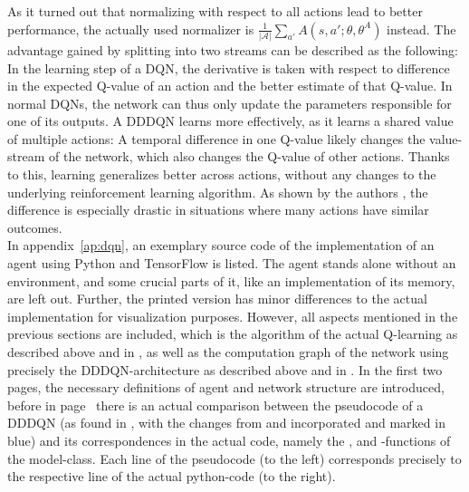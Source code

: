 As it turned out that normalizing with respect to all actions lead to better performance, the actually used normalizer is $\frac{1}{|\mathcal{A}|} \sum_{a'} A(s, a'; \theta, \theta^A)$ instead. The advantage gained by splitting into two streams can be described as the following: In the learning step of a DQN, the derivative is taken with respect to difference in the expected Q-value of an action and the better estimate of that Q-value. In normal DQNs, the network can thus only update the parameters responsible for one of its outputs. A DDDQN learns more effectively, as it learns a shared value of multiple actions: A temporal difference in one Q-value likely changes the value-stream of the network, which also changes the Q-value of other actions. Thanks to this, learning generalizes better across actions, without any changes to the underlying reinforcement learning algorithm. As shown by the authors \cite{wang_dueling_2015}, the difference is especially drastic in situations where many actions have similar outcomes.\\


In appendix~\ref{ap:dqn}, an exemplary source code of the implementation of an agent using Python and TensorFlow is listed. The agent stands alone without an environment, and some crucial parts of it, like an implementation of its memory, are left out. Further, the printed version has minor differences to the actual implementation for visualization purposes. However, all aspects mentioned in the previous sections are included, which is the algorithm of the actual Q-learning as described above and in \cite{van_hasselt_deep_2015}, as well as the computation graph of the network using precisely the DDDQN-architecture as described above and in \cite{wang_dueling_2015}. In the first two pages, the necessary definitions of agent and network structure are introduced, before in page~\pageref{ap:dqn_comparison} there is an actual comparison between the pseudocode of a DDDQN (as found in \cite{mnih_human-level_2015}, with the changes from \cite{van_hasselt_deep_2015} and \cite{lillicrap_continuous_2015} incorporated and marked in blue) and its correspondences in the actual code, namely the ,  and -functions of the model-class. Each line of the pseudocode (to the left) corresponds precisely to the respective line of the actual python-code (to the right).



